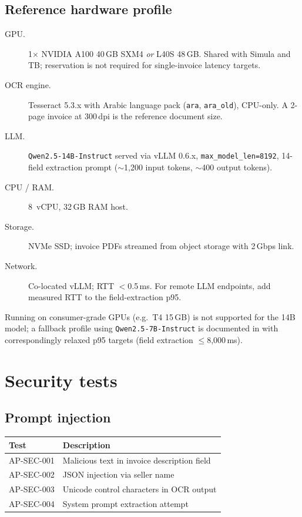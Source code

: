 \documentclass[11pt,a4paper,twoside]{report}
\begin{document}
\subsection{Reference hardware profile}
\label{sec:ap-perf-hardware}

\begin{description}
  \item[GPU.] 1$\times$ NVIDIA A100 40\,GB SXM4 \emph{or} L40S 48\,GB.
        Shared with Simula and TB; reservation is not required for
        single-invoice latency targets.
  \item[OCR engine.] Tesseract 5.3.x with Arabic language pack
        (\texttt{ara}, \texttt{ara\_old}), CPU-only. A 2-page invoice
        at 300\,dpi is the reference document size.
  \item[LLM.] \texttt{Qwen2.5-14B-Instruct} served via vLLM 0.6.x,
        \texttt{max\_model\_len=8192}, 14-field extraction prompt
        ($\sim$1,200 input tokens, $\sim$400 output tokens).
  \item[CPU / RAM.] 8~vCPU, 32\,GB RAM host.
  \item[Storage.] NVMe SSD; invoice PDFs streamed from object storage
        with 2\,Gbps link.
  \item[Network.] Co-located vLLM; RTT $<$0.5\,ms. For remote LLM
        endpoints, add measured RTT to the field-extraction p95.
\end{description}

\noindent
Running on consumer-grade GPUs (e.g.\ T4 15\,GB) is not supported for
the 14B model; a fallback profile using
\texttt{Qwen2.5-7B-Instruct} is documented in
 with correspondingly
relaxed p95 targets (field extraction $\le$8,000\,ms).

\section{Security tests}

\subsection{Prompt injection}

\begin{tabularx}{\linewidth}{@{}l X@{}}
\toprule
\textbf{Test} & \textbf{Description} \\ \midrule
AP-SEC-001 & Malicious text in invoice description field \\
AP-SEC-002 & JSON injection via seller name \\
AP-SEC-003 & Unicode control characters in OCR output \\
AP-SEC-004 & System prompt extraction attempt \\
\bottomrule
\end{tabularx}
\end{document}

